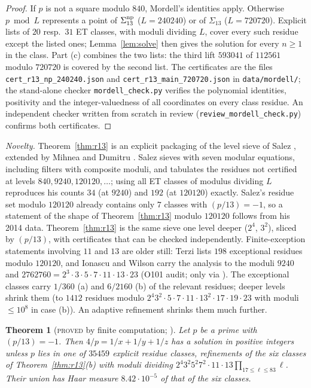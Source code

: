 \documentclass[11pt,reqno]{amsart}
\newtheorem{theorem}{Theorem}[section]
\theoremstyle{definition}
\newcommand{\status}[1]{\textup{\textsc{#1}}}
\begin{document}
\begin{proof}
If $p$ is not a square modulo $840$, Mordell's identities apply.
Otherwise $p\bmod L$ represents a point of $\Sigma_{13}^{\rm np}$
($L=240240$) or of $\Sigma_{13}$ ($L=720720$).  Explicit lists of $20$
resp.\ $31$ ET classes, with moduli dividing $L$, cover every such
residue except the listed ones; Lemma~\ref{lem:solve} then gives the
solution for every $n\ge1$ in the class.  Part (c) combines the two
lists: the third lift $593041$ of $112561$ modulo $720720$ is covered by
the second list.  The certificates are the files
\texttt{cert\_r13\_np\_240240.json} and
\texttt{cert\_r13\_main\_720720.json} in \texttt{data/mordell/}; the stand-alone checker
\texttt{mordell\_\allowbreak check.py} verifies the polynomial identities,
positivity and the integer-valuedness of all coordinates on every class
residue.  An independent checker written from scratch in review
(\texttt{review\_\allowbreak mordell\_\allowbreak check.py}) confirms both certificates.
\end{proof}

\emph{Novelty.} Theorem~\ref{thm:r13} is an explicit packaging of the
level sieve of Salez \cite[\S\S3--4]{Salez}, extended by Mihnea and
Dumitru \cite{MD}.  Salez sieves with seven modular equations, including
filters with composite moduli, and tabulates the residues not certified
at levels $840,9240,120120,\dots$; using all ET classes of modulus
dividing $L$ reproduces his counts $34$ (at $9240$) and $192$ (at
$120120$) exactly.  Salez's residue set modulo $120120$ already contains
only $7$ classes with $(p/13)=-1$, so a statement of the shape of
Theorem~\ref{thm:r13} modulo $120120$ follows from his 2014 data.
Theorem~\ref{thm:r13} is the same sieve one level deeper ($2^4$, $3^2$),
sliced by $(p/13)$, with certificates that can be checked independently.
Finite-exception statements involving $11$ and $13$ are older still:
Terzi \cite{Terzi} lists $198$ exceptional residues modulo $120120$, and
Ionascu and Wilson \cite{IW} carry the analysis to the moduli $9240$
and $2762760=2^3\cdot3\cdot5\cdot7\cdot11\cdot13\cdot23$ (O101 audit;
\cite{Terzi} only via \cite{IW}).
The exceptional classes carry $1/360$ (a) and $6/2160$ (b) of the
relevant residues; deeper levels shrink them (to $1412$ residues modulo
$2^4 3^2\cdot5\cdot7\cdot11\cdot13^2\cdot17\cdot19\cdot23$ with moduli
$\le10^8$ in case (b)).  An adaptive refinement shrinks them much
further.

\begin{theorem}[\status{proved} by finite computation; {\cite[Thm.~6.1]{PM13C}}]\label{thm:tree13}
Let $p$ be a prime with $(p/13)=-1$.  Then $4/p=1/x+1/y+1/z$ has a
solution in positive integers unless $p$ lies in one of $35459$ explicit
residue classes, refinements of the six classes of
Theorem~\ref{thm:r13}(b) with moduli dividing
$2^4 3^2 5^2 7^2\cdot11\cdot13\prod_{17\le\ell\le83}\ell$.  Their union has
Haar measure $8.42\cdot10^{-5}$ of that of the six classes.
\end{theorem}
\end{document}
